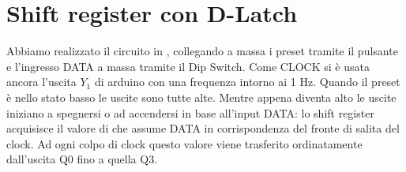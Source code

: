 \section{Shift register con D-Latch}
Abbiamo realizzato il circuito in  , collegando a massa i preset tramite il pulsante e l'ingresso DATA a massa tramite il Dip Switch. Come CLOCK si è usata ancora l'uscita $Y_1$ di arduino con una frequenza intorno ai 1 Hz. Quando il preset è nello stato basso le uscite sono tutte alte. Mentre appena diventa alto le uscite iniziano a spegnersi o ad accendersi in base all'input DATA: lo shift register acquisisce il valore di che assume DATA in corrispondenza del fronte di salita del clock. Ad ogni colpo di clock questo valore viene trasferito ordinatamente dall'uscita Q0 fino a quella Q3.